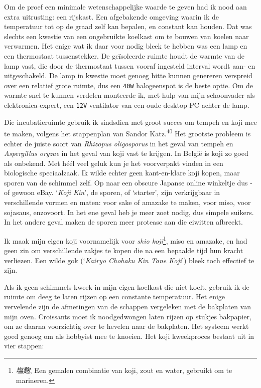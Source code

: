 \documentclass[
  11pt,
  dutch,
]{memoir}
\begin{document}
Om de proef een minimale wetenschappelijke waarde te geven had ik nood
aan extra uitrusting: een rijskast. Een afgebakende omgeving waarin ik
de temperatuur tot op de graad zelf kan bepalen, en constant kan houden.
Dat was slechts een kwestie van een ongebruikte koelkast om te bouwen
van koelen naar verwarmen. Het enige wat ik daar voor nodig bleek te
hebben was een lamp en een thermostaat tussenstekker. De geïsoleerde
ruimte houdt de warmte van de lamp vast, die door de thermostaat tussen
vooraf ingesteld interval wordt aan- en uitgeschakeld. De lamp in
kwestie moet genoeg hitte kunnen genereren verspreid over een relatief
grote ruimte, dus een \texttt{40W} halogeenspot is de beste optie. Om de
warmte snel te kunnen verdelen monteerde ik, met hulp van mijn
schoonvader als elektronica-expert, een \texttt{12V} ventilator van een
oude desktop PC achter de lamp.

Die incubatieruimte gebruik ik sindsdien met groot succes om tempeh en
koji mee te maken, volgens het stappenplan van Sandor
Katz.\textsuperscript{40} Het grootste probleem is echter de juiste
soort van \emph{Rhizopus oligosporus} in het geval van tempeh en
\emph{Aspergillus oryzae} in het geval van koji vast te krijgen. In
België is koji zo goed als onbekend. Met héél veel geluk kun je het
voorverpakt vinden in een biologische speciaalzaak. Ik wilde echter geen
kant-en-klare koji kopen, maar sporen van de schimmel zelf. Op naar een
obscure Japanse online winkeltje dus - of gewoon eBay. `\emph{Koji
Kin}', de sporen, of `starter', zijn verkrijgbaar in verschillende
vormen en maten: voor sake of amazake te maken, voor miso, voor
sojasaus, enzovoort. In het ene geval heb je meer zoet nodig, dus
simpele suikers. In het andere geval maken de sporen meer protease aan
die eiwitten afbreekt.

Ik maak mijn eigen koji voornamelijk voor \emph{shio koji}\footnote{\emph{塩麹},
  Een gemalen combinatie van koji, zout en water, gebruikt om te
  marineren.}, miso en amazake, en had geen zin om verschillende zakjes
te kopen die na een bepaalde tijd hun kracht verliezen. Een wilde gok
(`\emph{Kairyo Chohaku Kin Tane Koji}') bleek toch effectief te zijn.

Als ik geen schimmels kweek in mijn eigen koelkast die niet koelt,
gebruik ik de ruimte om deeg te laten rijzen op een constante
temperatuur. Het enige vervelende zijn de afmetingen van de schappen
vergeleken met de bakplaten van mijn oven. Croissants moet ik
noodgedwongen laten rijzen op stukjes bakpapier, om ze daarna
voorzichtig over te hevelen naar de bakplaten. Het systeem werkt goed
genoeg om als hobbyist mee te knoeien. Het koji kweekproces bestaat uit
in vier stappen:
\end{document}

